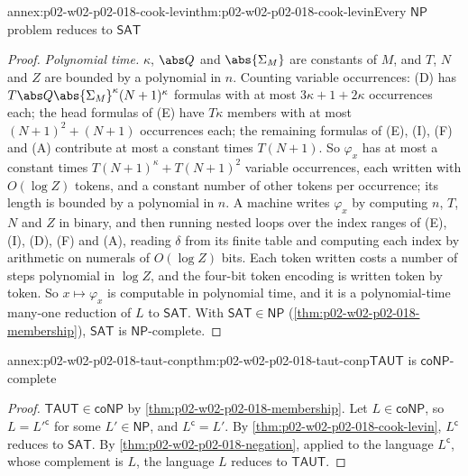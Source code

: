 \begin{annexitem}{annex:p02-w02-p02-018-cook-levin}{thm:p02-w02-p02-018-cook-levin}{Every \(\mathsf{NP}\) problem reduces to \(\mathsf{SAT}\)}
\begin{proof}
\emph{Polynomial time.}  \(\kappa\), \(\abs Q\) and \(\abs{\Sigma_M}\) are
constants of \(M\), and \(T\), \(N\) and \(Z\) are bounded by a polynomial in
\(n\).  Counting variable occurrences: (D) has
\(T\abs Q\abs{\Sigma_M}^{\kappa}(N+1)^{\kappa}\) formulas with at most
\(3\kappa+1+2\kappa\) occurrences each; the head formulas of (E) have
\(T\kappa\) members with at most \((N+1)^2+(N+1)\) occurrences each; the
remaining formulas of (E), (I), (F) and (A) contribute at most a constant
times \(T(N+1)\).  So \(\varphi_x\) has at most a constant times
\(T(N+1)^{\kappa}+T(N+1)^{2}\) variable occurrences, each written with
\(O(\log Z)\) tokens, and a constant number of other tokens per occurrence;
its length is bounded by a polynomial in \(n\).  A machine writes
\(\varphi_x\) by computing \(n\), \(T\), \(N\) and \(Z\) in binary, and then
running nested loops over the index ranges of (E), (I), (D), (F) and (A),
reading \(\delta\) from its finite table and computing each index by
arithmetic on numerals of \(O(\log Z)\) bits.  Each token written costs a
number of steps polynomial in \(\log Z\), and the four-bit token encoding is
written token by token.  So \(x\mapsto\varphi_x\) is computable in
polynomial time, and it is a polynomial-time many-one reduction of \(L\) to
\(\mathsf{SAT}\).  With \(\mathsf{SAT}\in\mathsf{NP}\)
(\cref{thm:p02-w02-p02-018-membership}), \(\mathsf{SAT}\) is
\(\mathsf{NP}\)-complete.
\end{proof}
\end{annexitem}

\begin{annexitem}{annex:p02-w02-p02-018-taut-conp}{thm:p02-w02-p02-018-taut-conp}{\(\mathsf{TAUT}\) is \(\mathsf{coNP}\)-complete}
\begin{proof}
\(\mathsf{TAUT}\in\mathsf{coNP}\) by \cref{thm:p02-w02-p02-018-membership}.
Let \(L\in\mathsf{coNP}\), so \(L=L'^{\mathsf c}\) for some
\(L'\in\mathsf{NP}\), and \(L^{\mathsf c}=L'\).  By
\cref{thm:p02-w02-p02-018-cook-levin}, \(L^{\mathsf c}\) reduces to
\(\mathsf{SAT}\).  By \cref{thm:p02-w02-p02-018-negation}, applied to the
language \(L^{\mathsf c}\), whose complement is \(L\), the language \(L\)
reduces to \(\mathsf{TAUT}\).
\end{proof}
\end{annexitem}

